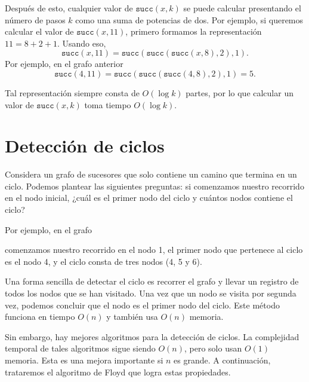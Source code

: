 Después de esto, cualquier valor de $\texttt{succ}(x,k)$ se puede calcular
presentando el número de pasos $k$ como una suma de potencias de dos.
Por ejemplo, si queremos calcular el valor de $\texttt{succ}(x,11)$,
primero formamos la representación $11=8+2+1$.
Usando eso,
\[\texttt{succ}(x,11)=\texttt{succ}(\texttt{succ}(\texttt{succ}(x,8),2),1).\]
Por ejemplo, en el grafo anterior
\[\texttt{succ}(4,11)=\texttt{succ}(\texttt{succ}(\texttt{succ}(4,8),2),1)=5.\]

Tal representación siempre consta de
$O(\log k)$ partes, por lo que calcular un valor de $\texttt{succ}(x,k)$
toma tiempo $O(\log k)$.

\section{Detección de ciclos}


Considera un grafo de sucesores que solo contiene
un camino que termina en un ciclo.
Podemos plantear las siguientes preguntas:
si comenzamos nuestro recorrido en el nodo inicial,
¿cuál es el primer nodo del ciclo
y cuántos nodos contiene el ciclo?

Por ejemplo, en el grafo

\begin{center}
\end{center}
comenzamos nuestro recorrido en el nodo 1,
el primer nodo que pertenece al ciclo es el nodo 4, y el ciclo consta
de tres nodos (4, 5 y 6).

Una forma sencilla de detectar el ciclo es recorrer el
grafo y llevar un registro de
todos los nodos que se han visitado. Una vez que un nodo se visita
por segunda vez, podemos concluir
que el nodo es el primer nodo del ciclo.
Este método funciona en tiempo $O(n)$ y también usa
$O(n)$ memoria.

Sin embargo, hay mejores algoritmos para la detección de ciclos.
La complejidad temporal de tales algoritmos sigue siendo $O(n)$,
pero solo usan $O(1)$ memoria.
Esta es una mejora importante si $n$ es grande.
A continuación, trataremos el algoritmo de Floyd que
logra estas propiedades.

